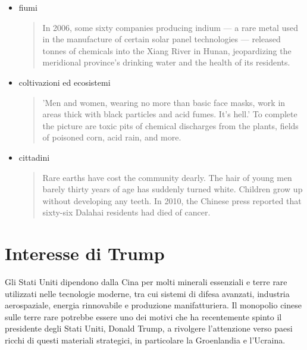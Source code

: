 \documentclass[12pt,a4paper,oneside]{book}
\begin{document}
\begin{itemize}
\item fiumi
\begin{quote}
\small
In 2006, some sixty companies producing indium — a rare metal used in the manufacture of certain solar panel technologies — released tonnes of chemicals into the Xiang River in Hunan, jeopardizing the meridional province's drinking water and the health of its residents. \citep[p. 25]{pitron2020rare}
\end{quote}

\item coltivazioni ed ecosistemi
\begin{quote}
\small
'Men and women, wearing no more than basic face masks, work in areas thick with black particles and acid fumes. It's hell.' To complete the picture are toxic pits of chemical discharges from the plants, fields of poisoned corn, acid rain, and more. \citep[p. 26]{pitron2020rare}
\end{quote}

\item cittadini
\begin{quote}
\small
Rare earths have cost the community dearly. The hair of young men barely thirty years of age has suddenly turned white. Children grow up without developing any teeth. In 2010, the Chinese press reported that sixty-six Dalahai residents had died of cancer. \citep[p. 29]{pitron2020rare}
\end{quote}
    
\end{itemize}

\section{Interesse di Trump}

Gli Stati Uniti dipendono dalla Cina per molti minerali essenziali e terre rare utilizzati nelle tecnologie moderne, tra cui sistemi di difesa avanzati, industria aerospaziale, energia rinnovabile e produzione manifatturiera.
Il monopolio cinese sulle terre rare potrebbe essere uno dei motivi che ha recentemente spinto il presidente degli Stati Uniti, Donald Trump, a rivolgere l'attenzione verso paesi ricchi di questi materiali strategici, in particolare la Groenlandia e l'Ucraina.
\end{document}
